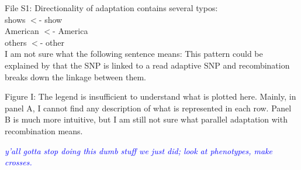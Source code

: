 \documentclass[onecolumn,oneside,letterpaper]{article}
\newcommand{\jri}[1]{\textcolor{blue}{ \emph{\scriptsize  #1}} }
\begin{document}
File S1: Directionality of adaptation contains several typos: \\
shows $<$- show \\
American $<$- America \\
others $<$- other \\
I am not sure what the following sentence means: This pattern could be explained by that the SNP is linked to a read adaptive SNP and recombination breaks down the linkage between them.  

Figure I: The legend is insufficient to understand what is plotted here. Mainly, in panel A, I cannot find any description of what is represented in each row. Panel B is much more intuitive, but I am still not sure what parallel adaptation with recombination means.  

\jri{y'all gotta stop doing this dumb stuff we just did; look at phenotypes, make crosses.}


\end{document}
